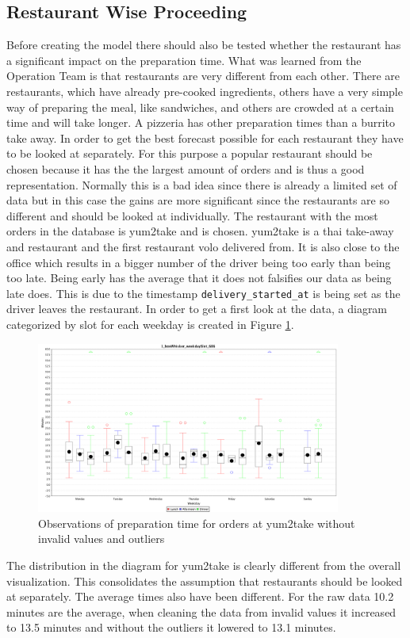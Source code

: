 \subsection{Restaurant Wise Proceeding}\label{subsection:Restaurant Wise Proceeding}
Before creating the model there should also be tested whether the restaurant has a significant impact on the preparation time.\newline
What was learned from the Operation Team is that restaurants are very different from each other. There are restaurants, which have already pre-cooked ingredients, others have a very simple way of preparing the meal, like sandwiches, and others are crowded at a certain time and will take longer. A pizzeria has other preparation times than a burrito take away.\newline
In order to get the best forecast possible for each restaurant they have to be looked at separately. For this purpose a popular restaurant should be chosen because it has the the largest amount of orders and is thus a good representation. Normally this is a bad idea since there is already a limited set of data but in this case the gains are more significant since the restaurants are so different and should be looked at individually.\newline
The restaurant with the most orders in the database is yum2take and is chosen. yum2take is a thai take-away and restaurant and the first restaurant volo delivered from. It is also close to the office which results in a bigger number of the driver being too early than being too late. Being early has the average that it does not falsifies our data as being late does. This is due to the timestamp \texttt{delivery\_started\_at} is being set as the driver leaves the restaurant. In order to get a first look at the data, a diagram categorized by slot for each weekday is created in Figure \ref{fig:1_boxWhisker_weekdaySlot_686}.
\begin{figure}[h]
\begin{center}
\includegraphics[width=10cm]{images/1_boxWhisker_weekdaySlot_686.png}
\caption{Observations of preparation time for orders at yum2take without invalid values and outliers}
\label{fig:1_boxWhisker_weekdaySlot_686}
\end{center}
\end{figure}
The distribution in the diagram for yum2take is clearly different from the overall visualization. This consolidates the assumption that restaurants should be looked at separately. The average times also have been different. For the raw data 10.2 minutes are the average, when cleaning the data from invalid values it increased to 13.5 minutes and without the outliers it lowered to 13.1 minutes.
